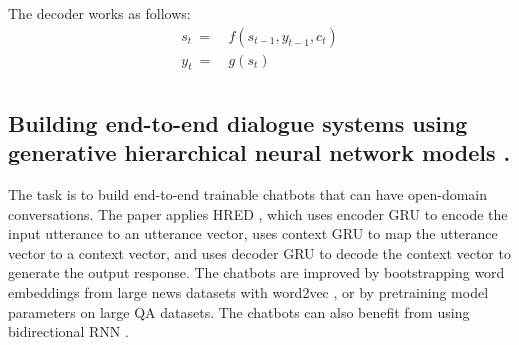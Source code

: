 \documentclass[paper=a4, fontsize=18pt]{article} %
\numberwithin{equation}{section} %
\numberwithin{figure}{section} %
\numberwithin{table}{section} %
\begin{document}
The decoder works as follows:
\begin{equation}
\begin{aligned}
s_{t} \ =& \ f( s_{t-1}, y_{t-1}, c_{t} ) \\
y_{t} \ =& \ g( s_{t} ) \\
\end{aligned}
\end{equation}


\subsection{Building end-to-end dialogue systems using generative hierarchical neural network models \cite{Serban2016Building}.}

The task is to build end-to-end trainable chatbots that can have open-domain conversations. The paper applies HRED \cite{Sordoni2015Hierarchical}, which uses encoder GRU \cite{Chung2014Empirical, Cho2014Learning} to encode the input utterance to an utterance vector, uses context GRU to map the utterance vector to a context vector, and uses decoder GRU to decode the context vector to generate the output response. The chatbots are improved by bootstrapping word embeddings from large news datasets with word2vec \cite{Mikolov2014Empirical}, or by pretraining model parameters on large QA datasets. The chatbots can also benefit from using bidirectional RNN \cite{Sundermeyer2014Translation}.

\end{document}
